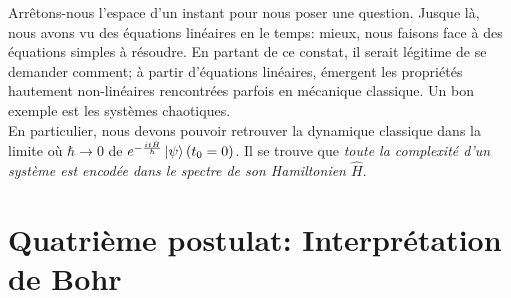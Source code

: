 \documentclass[../notesdecours.tex]{subfiles}
\begin{document}
    Arrêtons-nous l'espace d'un instant pour nous poser une question. Jusque là, nous avons vu des équations linéaires en le temps: mieux, nous faisons face à des équations simples à résoudre. En partant de ce constat, il serait légitime de se demander comment; à partir d'équations linéaires, émergent les propriétés hautement non-linéaires rencontrées parfois en mécanique classique. Un bon exemple est les systèmes chaotiques.\\

    En particulier, nous devons pouvoir retrouver la dynamique classique dans la limite où $\hbar\to 0$ de $e^{-\frac{it\hat{H}}{\hbar}}\ket{\psi}(t_0 = 0)$. Il se trouve que \emph{toute la complexité d'un système est encodée dans le spectre de son Hamiltonien $\hat{H}$}.

    \section{Quatrième postulat: Interprétation de Bohr}
\end{document}
